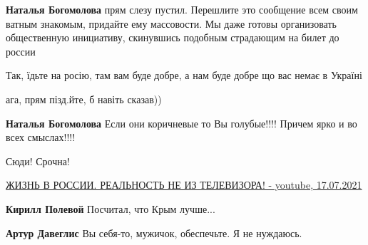 \begin{itemize}
\begin{itemize}
\textbf{Наталья Богомолова} прям слезу пустил.
Перешлите это сообщение всем своим ватным знакомым, придайте ему массовости. Мы даже готовы организовать общественную инициативу, скинувшись подобным страдающим на билет до россии

 
Так, їдьте на росію, там вам буде добре, а нам буде добре що вас немає в Україні

 
ага, прям пізд.йте, б навіть сказав))

 
\textbf{Наталья Богомолова} Если они коричневые то Вы голубые!!!! Причем ярко и во всех смыслах!!!!

 
Сюди! Срочна!

\href{https://youtu.be/mpMWEAGzN-o}{%
ЖИЗНЬ В РОССИИ. РЕАЛЬНОСТЬ НЕ ИЗ ТЕЛЕВИЗОРА! - youtube, 17.07.2021}

 
\textbf{Кирилл Полевой}
Посчитал, что Крым лучше... \Laughey[1.0][white]

 
\textbf{Артур Давеглис}
Вы себя-то, мужичок, обеспечьте.
Я не нуждаюсь.
\Laughey[1.0][white]


\end{itemize}
\end{itemize}
